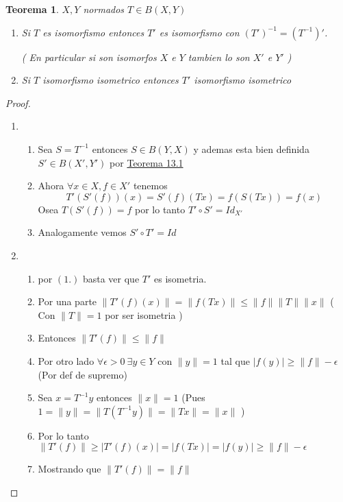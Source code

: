\documentclass[10pt]{extarticle}
\theoremstyle{break}
\newtheorem{theorem}{Teorema}[section]
\theoremstyle{definition}
\begin{document}
\begin{theorem} \label{13.2}
	$ X,Y $ normados $ T\in B( X,Y )   $ 
	\begin{enumerate}
		\item Si $ T $ es isomorfismo entonces $ T' $ es isomorfismo con $ ( T')^{-1} =( T^{-1} )'  $. 

			( En particular si son isomorfos $ X $ e $ Y $ tambien lo son $ X' $ e $ Y' $ )  
		\item Si $ T $ isomorfismo isometrico entonces $ T' $ isomorfismo isometrico
	\end{enumerate}
\end{theorem}
\begin{proof}
	\begin{enumerate}
		\item 
		\begin{enumerate}
			\item Sea $S=T^{-1} $ entonces $ S\in B( Y,X )   $ y ademas esta bien definida $S'\in B( X',Y')$ por \hyperref[13.1]{Teorema 13.1} 
			\item Ahora $ \forall x\in X ,f\in X'  $ tenemos
			$$T'( S'(f))(x)=S'( f)( Tx)=f( S( Tx))=f( x)$$       
			Osea $T( S'( f))=f$ por lo tanto $T'\circ S'=Id_{X'}$  
			\item Analogamente vemos $S'\circ T'=Id$ 
		\end{enumerate}
	\item
		\begin{enumerate}\item por $(1.)$ basta ver que $T'$ es isometria. 
				\item Por una parte $\lVert T'(f)(x) \rVert =\lVert f(Tx) \rVert \leq \lVert f \rVert \lVert T \rVert \lVert x \rVert $ ( Con $\lVert T \rVert =1$ por ser isometria ) 
			\item Entonces $\lVert T'(f) \rVert \leq \lVert f \rVert $ 
			\item Por otro lado $\forall \epsilon>0\ \exists y\in Y$ con $\lVert y \rVert =1$ tal que $\lvert f(y) \rvert \geq \lVert f \rVert -\epsilon$ (Por def de supremo)
			\item Sea $x=T^{-1} y$ entonces $\lVert x \rVert =1$ (Pues $1= \lVert y \rVert =\lVert T(T^{-1} y) \rVert =\lVert T x \rVert =\lVert x \rVert $ ) 
			\item Por lo tanto $\lVert T'(f) \rVert \geq \lvert T'(f)(x) \rvert =\lvert f(Tx) \rvert= \lvert f(y) \rvert \geq \lVert f \rVert -\epsilon $ 
			\item Mostrando que $\lVert T'(f) \rVert =\lVert f \rVert $ 
		\end{enumerate}	
	\end{enumerate}
\end{proof}
\end{document}

